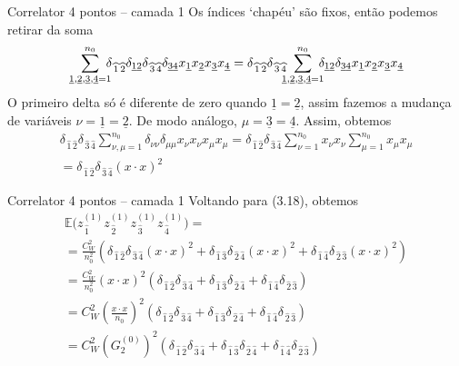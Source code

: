 \documentclass{beamer}
\newcommand{\EE}{\mathbb{E}}
\def\mi#1{{\,\widehat{#1}}}
\def\mj#1{\underline{#1}}
\begin{document}
\begin{frame}{Correlator 4 pontos -- camada 1}
	Os índices `chapéu' são fixos, então podemos retirar da soma
	\begin{multline*}
		\sum_{\mj1,\mj2,\mj3,\mj4=1}^{n_0}\hspace{-2mm}\delta_{\mi1\mi2}\delta_{\mj1\mj2}\delta_{\mi3\mi4}\delta_{\mj3\mj4} x_{\mj1}x_{\mj2}x_{\mj3}x_{\mj4}  = 
		\delta_{\mi1\mi2}\delta_{\mi3\mi4}\hspace{-2mm}\sum_{\mj1,\mj2,\mj3,\mj4=1}^{n_0}\hspace{-2mm}\delta_{\mj1\mj2}\delta_{\mj3\mj4} x_{\mj1}x_{\mj2}x_{\mj3}x_{\mj4} 
	\end{multline*}
	O primeiro delta só é diferente de zero quando $\mj1 = \mj2$, assim fazemos a mudança de variáveis $\nu = \mj1 = \mj2$. 
	De modo análogo, $\mu = \mj3 = \mj4$. Assim, obtemos
	\small
	\begin{multline*}
		\delta_{\mi1\mi2}\delta_{\mi3\mi4}\sum_{\nu,\mu=1}^{n_0}\delta_{\nu\nu}\delta_{\mu\mu} x_{\nu}x_{\nu}x_{\mu}x_{\mu} =
	\delta_{\mi1\mi2}\delta_{\mi3\mi4}\sum_{\nu=1}^{n_0}x_{\nu}x_{\nu} \sum_{\mu=1}^{n_0}x_{\mu}x_{\mu} \\
	= \delta_{\mi1\mi2}\delta_{\mi3\mi4} (x\cdot x)^2
	\end{multline*}
\end{frame}

\begin{frame}{Correlator 4 pontos -- camada 1}
	Voltando para (3.18), obtemos
	\begin{multline*}\tag{3.18}\label{eq:tresdezoito}
		\EE\big(z^{(1)}_{\mi1} z^{(1)}_{\mi2} z^{(1)}_{\mi3} z^{(1)}_{\mi4}\big) = \\
		 = \frac{C_W^2}{n_0^2}\left(\delta_{\mi1\mi2}\delta_{\mi3\mi4} (x\cdot x)^2 + \delta_{\mi1\mi3}\delta_{\mi2\mi4} (x\cdot x)^2 + \delta_{\mi1\mi4}\delta_{\mi2\mi3} (x\cdot x)^2 \right) \\
		 = \frac{C_W^2}{n_0^2} (x\cdot x)^2 \left(\delta_{\mi1\mi2}\delta_{\mi3\mi4} + \delta_{\mi1\mi3}\delta_{\mi2\mi4} + \delta_{\mi1\mi4}\delta_{\mi2\mi3} \right)\\
		 = C_W^2 \left(\frac{x\cdot x}{n_0}\right)^2 \left(\delta_{\mi1\mi2}\delta_{\mi3\mi4} + \delta_{\mi1\mi3}\delta_{\mi2\mi4} + \delta_{\mi1\mi4}\delta_{\mi2\mi3} \right)\\
		 = C_W^2 \left(G^{(0)}_2 \right)^2\left(\delta_{\mi1\mi2}\delta_{\mi3\mi4} + \delta_{\mi1\mi3}\delta_{\mi2\mi4} + \delta_{\mi1\mi4}\delta_{\mi2\mi3} \right)
	\end{multline*}
\end{frame}
\end{document}

